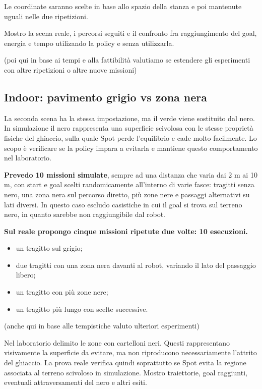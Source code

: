 \documentclass[11pt,a4paper]{article}
\begin{document}
Le coordinate saranno scelte in base allo spazio della stanza e poi mantenute uguali nelle due ripetizioni.

Mostro la scena reale, i percorsi seguiti e il confronto fra raggiungimento del goal, energia e tempo utilizando la policy e senza utilizzarla. 

(poi qui in base ai tempi e alla fattibilità valutiamo se estendere gli esperimenti con altre ripetizioni o altre nuove missioni)

\subsection{Indoor: pavimento grigio vs zona nera}

La seconda scena ha la stessa impostazione, ma il verde viene sostituito dal nero.
In simulazione il nero rappresenta una superficie scivolosa con le stesse proprietà fisiche del ghiaccio, sulla quale Spot perde l'equilibrio e cade molto facilmente.
Lo scopo è verificare se la policy impara a evitarla e mantiene questo comportamento nel laboratorio.

\textbf{Prevedo 10 missioni simulate}, sempre ad una distanza che varia dai 2 m ai 10 m, con start e goal scelti randomicamente all'interno di varie fasce: tragitti senza nero, una zona nera sul percorso diretto, più zone nere e passaggi alternativi su lati diversi.
In questo caso escludo casistiche in cui il goal si trova sul terreno nero, in quanto sarebbe non raggiungibile dal robot.

\textbf{Sul reale propongo cinque missioni ripetute due volte: 10 esecuzioni.}
\begin{itemize}
\item un tragitto sul grigio;
\item due tragitti con una zona nera davanti al robot, variando il lato del passaggio libero;
\item un tragitto con più zone nere;
\item un tragitto più lungo con scelte successive.
\end{itemize}

(anche qui in base alle tempistiche valuto ulteriori esperimenti)

Nel laboratorio delimito le zone con cartelloni neri.
Questi rappresentano visivamente la superficie da evitare, ma non riproducono necessariamente l'attrito del ghiaccio. La prova reale verifica quindi soprattutto se Spot evita la regione associata al terreno scivoloso in simulazione. Mostro traiettorie, goal raggiunti, eventuali attraversamenti del nero e altri esiti.
\end{document}

